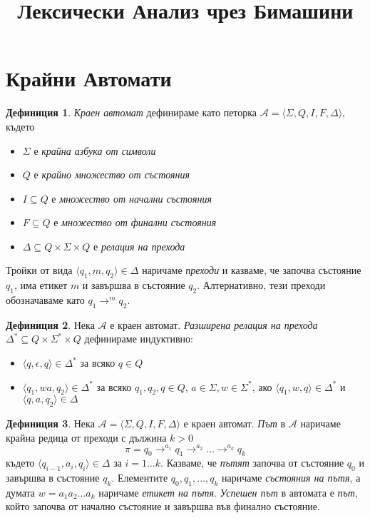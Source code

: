 \documentclass[11pt, oneside]{article}
\title{Лексически Анализ чрез Бимашини}
\theoremstyle{definition}
\newtheorem{definition}{Дефиниция}[section]
\begin{document}
\section{Крайни Автомати}

\begin{definition}
	\emph{Краен автомат} дефинираме като петорка \( \mathcal{A} = \langle \Sigma, Q, I, F, \Delta \rangle \), където

	\begin{itemize}
		\item \( \Sigma \) е \emph{крайна азбука от символи}
		\item \( Q \) е \emph{крайно множество от състояния}
		\item \( I \subseteq Q \) е \emph{множество от начални състояния}
		\item \( F \subseteq Q \) е \emph{множество от финални състояния}
		\item \( \Delta \subseteq Q \times \Sigma \times Q \) е \emph{релация на прехода}
	\end{itemize}
 
	Тройки от вида \( \langle q_1, m, q_2 \rangle \in \Delta \) наричаме \emph{преходи} и казваме, че започва състояние \( q_1 \), има етикет \( m \) и завършва в състояние \( q_2 \). Алтернативно, тези преходи обозначаваме като \( q_1 \to^m q_2 \).
\end{definition}

\begin{definition}  
	Нека \( \mathcal{A} \) е краен автомат. \emph{Разширена релация на прехода} \( \Delta^* \subseteq Q \times \Sigma^* \times Q \) дефинираме индуктивно:

	\begin{itemize}
		\item \( \langle q, \epsilon, q \rangle \in \Delta^* \) за всяко \( q \in Q \)
		\item \( \langle q_1, wa, q_2 \rangle \in \Delta^* \) за всяко \( q_1, q_2, q \in Q \), \( a \in \Sigma, w \in \Sigma^* \), ако \( \langle q_1, w, q \rangle \in \Delta^* \) и \( \langle q, a, q_2 \rangle \in \Delta \)
	\end{itemize}
\end{definition}

\begin{definition} 
	Нека \( \mathcal{A} = \langle \Sigma, Q, I, F, \Delta \rangle \) е краен автомат. \emph{Път} в \( \mathcal{A} \) наричаме крайна редица от преходи с дължина \( k > 0 \) \[ \pi = q_0 \to^{a_1} q_1 \to^{a_2} \ldots \to^{a_k} q_k \] където \( \langle q_{i-1}, a_i, q_i \rangle \in \Delta \) за \( i = 1 \ldots k \). Казваме, че \emph{пътят} започва от състояние \( q_0 \) и завършва в състояние \( q_k \). Елементите \( q_0,q_1, \ldots ,q_k \) наричаме \emph{състояния на пътя}, а думата \( w = a_1 a_2 \ldots a_k \) наричаме \emph{етикет на пътя}. \newline \emph{Успешен път} в автомата е \emph{път}, който започва от начално състояние и завършва във финално състояние.
\end{definition}
\end{document}

